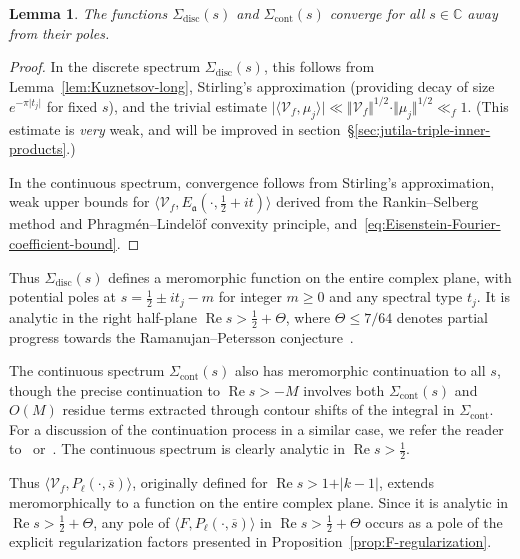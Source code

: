 \documentclass[11pt,reqno]{amsart}
\theoremstyle{plain}
\newtheorem{lemma}[theorem]{Lemma}
\theoremstyle{definition}
\numberwithin{equation}{section}
\renewcommand{\Re}{\operatorname{Re}}
\begin{document}
\begin{lemma} The functions $\Sigma_{\mathrm{disc}}(s)$ and $\Sigma_{\mathrm{cont}}(s)$ converge for all $s \in \mathbb{C}$ away from their poles.
\end{lemma}

\begin{proof}
In the discrete spectrum $\Sigma_{\mathrm{disc}}(s)$, this follows from Lemma~\ref{lem:Kuznetsov-long}, Stirling's approximation (providing decay of size $e^{-\pi \vert t_j \vert}$ for fixed $s$), and the trivial estimate $\vert \langle \mathcal{V}_f, \mu_j \rangle  \vert \ll \Vert \mathcal{V}_f \Vert^{1/2} \cdot \Vert \mu_j \Vert^{1/2} \ll_f 1$. (This estimate is \emph{very} weak, and will be improved in section~\S{\ref{sec:jutila-triple-inner-products}}.)

In the continuous spectrum, convergence follows from Stirling's approximation, weak upper bounds for $\langle \mathcal{V}_f, E_\mathfrak{a}(\cdot, \frac{1}{2}+it) \rangle$ derived from the Rankin--Selberg method and Phragm\'{e}n--Lindel\"{o}f convexity principle, and~\eqref{eq:Eisenstein-Fourier-coefficient-bound}.
\end{proof}

Thus $\Sigma_{\mathrm{disc}}(s)$ defines a meromorphic function on the entire complex plane, with potential poles at $s= \frac{1}{2} \pm it_j - m$ for integer $m \geq 0$ and any spectral type $t_j$. It is analytic in the right half-plane $\Re s > \frac{1}{2} + \Theta$, where $\Theta \leq 7/64$ denotes partial progress towards the Ramanujan--Petersson conjecture~\cite{KimSarnak03}.

The continuous spectrum $\Sigma_{\mathrm{cont}}(s)$ also has meromorphic continuation to all $s$, though the precise continuation to $\Re s > - M$ involves both $\Sigma_{\mathrm{cont}}(s)$ and $O(M)$ residue terms extracted through contour shifts of the integral in $\Sigma_{\mathrm{cont}}$. For a discussion of the continuation process in a similar case, we refer the reader to~\cite[\S{4}]{HoffsteinHulse13} or~\cite[\S{3.3.2}]{HKLDWSphere}. The continuous spectrum is clearly analytic in $\Re s > \frac{1}{2}$.

Thus $\langle \mathcal{V}_f, P_\ell(\cdot, \overline{s}) \rangle$, originally defined for $\Re s > 1+\vert k -1 \vert$, extends meromorphically to a function on the entire complex plane. Since it is analytic in $\Re s > \frac{1}{2}+ \Theta$, any pole of $\langle F, P_\ell(\cdot, \overline{s}) \rangle$ in $\Re s > \frac{1}{2} + \Theta$ occurs as a pole of the explicit regularization factors presented in Proposition~\ref{prop:F-regularization}.
\end{document}
